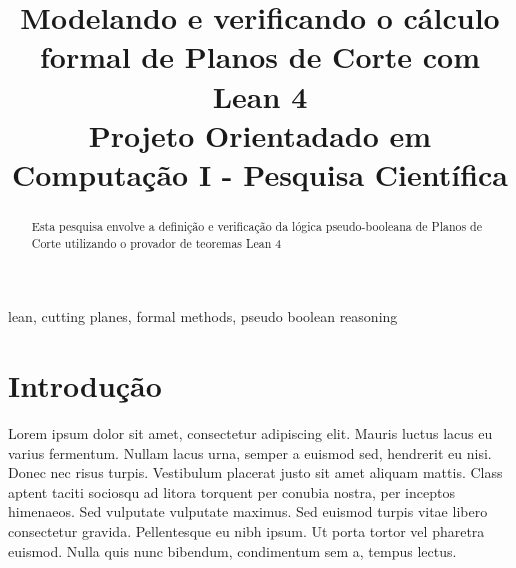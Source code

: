 \documentclass[conference]{IEEEtran}
\begin{document}
\title{Modelando e verificando o cálculo formal de Planos de Corte com Lean 4\\
{\footnotesize Projeto Orientadado em Computação I - Pesquisa Científica}
}

\author{
}

\maketitle

\begin{abstract}
    Esta pesquisa envolve a definição e verificação da lógica pseudo-booleana de
    Planos de Corte utilizando o provador de teoremas Lean 4

\end{abstract}

\begin{IEEEkeywords}
    lean, cutting planes, formal methods, pseudo boolean reasoning
\end{IEEEkeywords}

\section{Introdução}

Lorem ipsum dolor sit amet, consectetur adipiscing elit. Mauris luctus lacus eu varius fermentum. Nullam lacus urna, semper a euismod sed, hendrerit eu nisi. Donec nec risus turpis. Vestibulum placerat justo sit amet aliquam mattis. Class aptent taciti sociosqu ad litora torquent per conubia nostra, per inceptos himenaeos. Sed vulputate vulputate maximus. Sed euismod turpis vitae libero consectetur gravida. Pellentesque eu nibh ipsum. Ut porta tortor vel pharetra euismod. Nulla quis nunc bibendum, condimentum sem a, tempus lectus.
\end{document}
